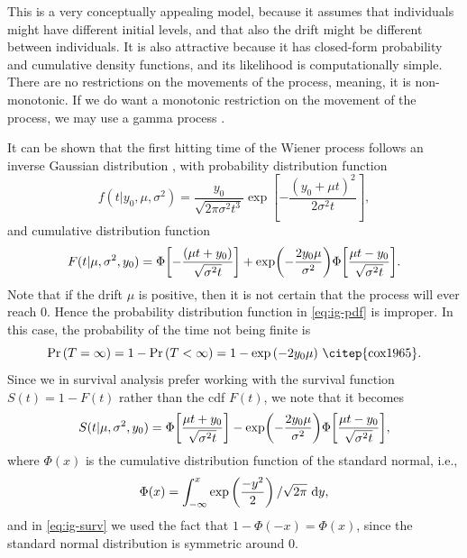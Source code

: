 This is a very conceptually appealing model, because it assumes that individuals might have different initial levels, and that also the drift might be different between individuals. It is also attractive because it has closed-form probability and cumulative density functions, and its likelihood is computationally simple. There are no restrictions on the movements of the process, meaning, it is non-monotonic. If we do want a monotonic restriction on the movement of the process, we may use a gamma process \citep{leewhitmore2006}.

It can be shown that the first hitting time of the Wiener process follows an inverse Gaussian distribution \citep{chhikara1988}, with probability distribution function
\begin{equation}
\label{eq:ig-pdf}
    f(t|y_0,\mu,\sigma^2)=\frac{y_0}{\sqrt{2\pi\sigma^2t^3}}\exp\left[-\frac{(y_0+\mu t)^2}{2\sigma^2t}\right],
\end{equation}
and cumulative distribution function
\begin{equation}
\label{eq:ig-cdf}
    F(t|\mu,\sigma^2,y_0)=\Phi\sqb*{-\frac{(\mu t+y_0)}{\sqrt{\sigma^2t}}}+\exp\p*{-\frac{2y_0\mu}{\sigma^2}}\Phi\sqb*{\frac{\mu t-y_0}{\sqrt{\sigma^2t}}}.
\end{equation}
Note that if the drift $\mu$ is positive, then it is not certain that the process will ever reach 0. Hence the probability distribution function in \eqref{eq:ig-pdf} is improper. In this case, the probability of the time not being finite is
\begin{equation*}
    \Pr{}(T=\infty)=1-\Pr{}(T<\infty)=1-\exp{(-2y_0\mu)} \text{ \citep{cox1965}}.
\end{equation*}
Since we in survival analysis prefer working with the survival function $S(t)=1-F(t)$ rather than the cdf $F(t)$, we note that it becomes
\begin{equation}
\label{eq:ig-surv}
    S(t|\mu,\sigma^2,y_0)=\Phi\sqb*{\frac{\mu t+y_0}{\sqrt{\sigma^2t}}}-\exp\p*{-\frac{2y_0\mu}{\sigma^2}}\Phi\sqb*{\frac{\mu t-y_0}{\sqrt{\sigma^2t}}},
\end{equation}
where $\Phi(x)$ is the cumulative distribution function of the standard normal, i.e.,
\begin{equation}
    \Phi(x)=\int_{-\infty}^x\exp\left(\frac{-y^2}{2}\right)/\sqrt{2\pi}\text{~d}y,
\end{equation}
and in \eqref{eq:ig-surv} we used the fact that $1-\Phi(-x)=\Phi(x)$, since the standard normal distribution is symmetric around 0.

